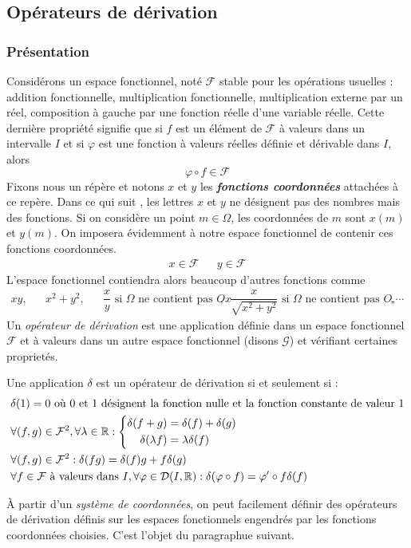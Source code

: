 \subsection{Opérateurs de dérivation}
\subsubsection{Présentation}
Considérons un espace fonctionnel, noté $\mathcal F$ stable pour les opérations usuelles : addition fonctionnelle, multiplication fonctionnelle, multiplication externe par un réel, composition à gauche par une fonction réelle d'une variable réelle. Cette dernière propriété signifie que si $f$ est un élément de $\mathcal F$ à valeurs dans un intervalle $I$ et si $\varphi$ est une fonction à valeurs réelles définie et dérivable dans $I$, alors
\begin{displaymath}
 \varphi \circ f \in \mathcal F
\end{displaymath}
Fixons nous un répère et notons $x$ et $y$ les \textbf{\emph{fonctions coordonnées}} attachées à ce repère. Dans ce qui suit , les lettres $x$ et $y$ ne désignent pas des nombres mais des fonctions. Si on considère un point $m\in \Omega$, les coordonnées de $m$  sont $x(m)$ et $y(m)$. On imposera évidemment à notre espace fonctionnel de contenir ces fonctions coordonnées.
\begin{align*}
 x\in \mathcal F & & y\in \mathcal F
\end{align*}
L'espace fonctionnel contiendra alors beaucoup d'autres fonctions comme
\begin{align*}
 xy ,& & x^2+y^2, & & \dfrac{x}{y} \text{ si $\Omega$ ne contient pas $Ox$} , & &
\dfrac{x}{\sqrt{x^2+y^2}} \text{ si $\Omega$ ne contient pas $O$} , & &
, \cdots
\end{align*}
Un \emph{opérateur de dérivation} est une application définie  dans un espace fonctionnel $\mathcal F$ et à valeurs dans un autre espace fonctionnel (disons $\mathcal G$) et vérifiant certaines proprietés.
\begin{defi}
Une application $\delta$ est un opérateur de dérivation si et seulement si :
\begin{align*}
 &\delta(1)=0 \text{ où $0$ et $1$ désignent la fonction nulle et la fonction constante de valeur $1$} \\
&\forall(f,g)\in \mathcal F^2 , \forall \lambda \in \mathbb{R} :
\left\lbrace 
\begin{aligned}
 \delta (f+g) &= \delta(f) + \delta(g) \\
\delta(\lambda f) &= \lambda \delta (f)
\end{aligned}
\right. 
 \\
&\forall(f,g)\in \mathcal F^2 : \delta (fg) = \delta(f) g +f\delta(g) \\
&\forall f \in \mathcal F \text{ à valeurs dans $I$}, \forall \varphi \in \mathcal D (I,\mathbb{R}) :
\delta(\varphi \circ f) = \varphi' \circ f \delta(f)
\end{align*} 
\end{defi}
\`A partir d'un \emph{système de coordonnées}, on peut facilement définir des opérateurs de dérivation définis sur les espaces fonctionnels engendrés par les fonctions coordonnées choisies. C'est l'objet du paragraphue suivant.
